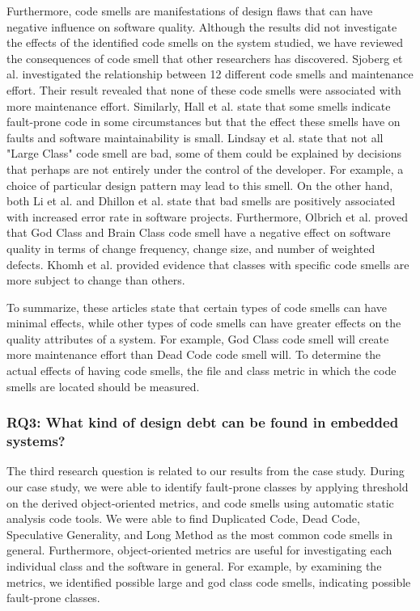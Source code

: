 Furthermore, code smells are manifestations of design flaws that can have negative influence on software quality. Although the results did not investigate the effects of the identified code smells on the system studied, we have reviewed the consequences of code smell that other researchers has discovered. Sjoberg et al.\cite{sjoberg2013quantifying} investigated the relationship between 12 different code smells and maintenance effort. Their result revealed that none of these code smells were associated with more maintenance effort. Similarly, Hall et al.\cite{hall2014some} state that some smells indicate fault-prone code in some circumstances but that the effect these smells have on faults and software maintainability is small. Lindsay et al.\cite{lindsay2010does} state that not all "Large Class" code smell are bad, some of them could be explained by decisions that perhaps are not entirely under the control of the developer. For example, a choice of particular design pattern may lead to this smell. On the other hand, both Li et al.\cite{li2007empirical} and Dhillon et al.\cite{dhillon2012can} state that bad smells are positively associated with increased error rate in software projects. Furthermore, Olbrich et al.\cite{olbrich2010all} proved that God Class and Brain Class code smell have a negative effect on software quality in terms of change frequency, change size, and number of weighted defects. Khomh et al.\cite{khomh2009exploratory} provided evidence that classes with specific code smells are more subject to change than others. 

To summarize, these articles state that certain types of code smells can have minimal effects, while other types of code smells can have greater effects on the quality attributes of a system. For example, God Class code smell will create more maintenance effort than Dead Code code smell will. To determine the actual effects of having code smells, the file and class metric in which the code smells are located should be measured.


\subsubsection{RQ3: What kind of design debt can be found in embedded systems?} 
The third research question is related to our results from the case study. During our case study, we were able to identify fault-prone classes by applying threshold on the derived object-oriented metrics, and code smells using automatic static analysis code tools. We were able to find Duplicated Code, Dead Code, Speculative Generality, and Long Method as the most common code smells in general. Furthermore, object-oriented metrics are useful for investigating each individual class and the software in general. For example, by examining the metrics, we identified possible large and god class code smells, indicating possible fault-prone classes.

